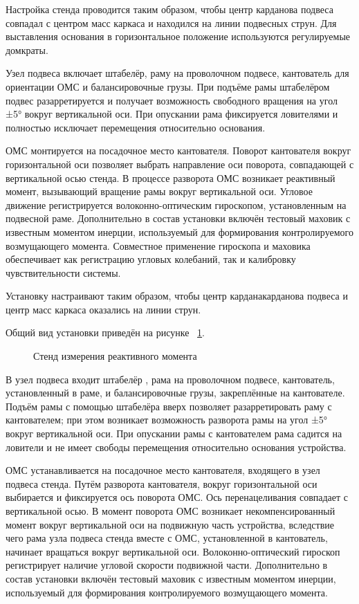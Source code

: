 Настройка стенда проводится таким образом, чтобы центр карданова подвеса совпадал с центром масс каркаса и находился на линии подвесных струн. Для выставления основания в горизонтальное положение используются регулируемые домкраты.

Узел подвеса включает штабелёр, раму на проволочном подвесе, кантователь для ориентации ОМС и балансировочные грузы. При подъёме рамы штабелёром подвес разарретируется и получает возможность свободного вращения на угол ±5° вокруг вертикальной оси. При опускании рама фиксируется ловителями и полностью исключает перемещения относительно основания.

ОМС монтируется на посадочное место кантователя. Поворот кантователя вокруг горизонтальной оси позволяет выбрать направление оси поворота, совпадающей с вертикальной осью стенда. В процессе разворота ОМС возникает реактивный момент, вызывающий вращение рамы вокруг вертикальной оси. Угловое движение регистрируется волоконно-оптическим гироскопом, установленным на подвесной раме. Дополнительно в состав установки включён тестовый маховик с известным моментом инерции, используемый для формирования контролируемого возмущающего момента. Совместное применение гироскопа и маховика обеспечивает как регистрацию угловых колебаний, так и калибровку чувствительности системы.

Установку настраивают таким образом, чтобы центр карданакарданова подвеса и центр масс каркаса оказались на линии струн.

Общий вид установки приведён на рисунке ~\cref{fig:yoiom}.
 
\begin{figure}[!h] 
	\caption{Стенд измерения реактивного момента}
	\label{fig:yoiom} 
\end{figure}

В узел подвеса входит штабелёр , рама на проволочном подвесе, кантователь, установленный в раме, и балансировочные грузы, закреплённые на кантователе. Подъём рамы с помощью штабелёра вверх позволяет разарретировать раму с кантователем; при этом возникает возможность разворота рамы на угол ±5° вокруг вертикальной оси. При опускании рамы с кантователем рама садится на ловители и не имеет свободы перемещения относительно основания устройства.

ОМС устанавливается на посадочное место кантователя, входящего в  узел подвеса стенда. Путём разворота кантователя, вокруг горизонтальной оси выбирается и фиксируется ось поворота ОМС. Ось перенацеливания совпадает с вертикальной осью. 
В момент поворота ОМС возникает некомпенсированный момент вокруг вертикальной оси на подвижную часть устройства, вследствие чего рама узла подвеса стенда вместе с ОМС, установленной в кантователь, начинает вращаться вокруг вертикальной оси. Волоконно-оптический гироскоп регистрирует наличие угловой скорости подвижной части. Дополнительно в состав установки включён тестовый маховик с известным моментом инерции, используемый для формирования контролируемого возмущающего момента.

